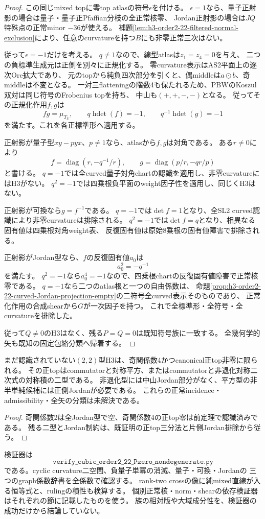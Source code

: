\begin{proof}
この同じmixed topに零top atlasの符号$\epsilon$を付ける。
$\epsilon=1$なら、量子正射影の場合は量子・量子正Pfaffian分枝の全正常核零、
Jordan正射影の場合は$JQ$特殊点の正常minor $-36$が使える。
補題\ref{lem:h3-order2-22-filtered-normal-exclusion}により、任意のcurvatureを持つ$B$にも非零正常三次はない。

従って$\epsilon=-1$だけを考える。
$q\ne1$なので、線型atlasは$z_1=z_4=0$を与え、
二つの負標準生成元は正側を別々に正規化する。
零curvature表示はAS2平面上の逐次Ore拡大であり、
元のtopから純負四次部分を引くと、偶middleは$a\mathbin{\odot}b$、奇middleは不変となる。
一対三flatteningの階数4も保たれるため、PBWのKoszul双対は同じ符号のFrobenius topを持ち、
中山も$(+,+,-,-)$となる。
従ってその正規化作用$f,g$は
\[
 fg=\mu_{T_U},\qquad
 q\operatorname{hdet}(f)=-1,\qquad
 q^{-1}\operatorname{hdet}(g)=-1
\]
を満たす。これを各正標準形へ適用する。

正射影が量子型$xy-pyx$、$p\ne1$なら、atlasから$f,g$は対角である。
ある$r\ne0$により
\[
 f=\operatorname{diag}(r,-q^{-1}/r),\qquad
 g=\operatorname{diag}(p/r,-qr/p)
\]
と書ける。
$q=-1$では全curved量子対角chartの認識を適用し、非零curvatureにはH3がない。
$q^2=-1$では四乗根負平面のweight因子性を適用し、同じくH3はない。

正射影が可換なら$g=f^{-1}$である。
$q=-1$では$\det f=1$となり、全SL2 curved認識により非零curvatureは排除される。
$q^2=-1$では$\det f=q$となり、相異なる固有値は四乗根対角weight表、
反復固有値は原始8乗根の固有値障害で排除される。

正射影がJordan型なら、$f$の反復固有値$a_0$は
\[
 a_0^2=-q^{-1}
\]
を満たす。
$q^2=-1$なら$a_0^4=-1$なので、四乗根chartの反復固有値障害で正常核零である。
$q=-1$なら二つのatlas根と一つの自由係数は、
命題\ref{prop:h3-order2-22-curved-Jordan-projection-empty}の二符号全curved表示そのものであり、
正常化作用の合成shearから$G$が一次因子を持つ。
これで全標準形・全符号・全curvatureを排除した。

従って$Q\ne0$のH3はなく、残る$P=Q=0$は既知符号族に一致する。
全幾何学的矢も既知の固定包絡分類へ帰着する。
\end{proof}

\begin{corollary}
\label{cor:h3-order2-22-nonzero-positive-remainder}
まだ認識されていない$(2,2)$型H3は、奇関係数4かつcanonical正top非零に限られる。
その正topはcommutatorと対称平方、またはcommutatorと非退化対称二次式の対称積の二型である。
非退化型には中山Jordan部分がなく、平方型の非半単純候補には正側Jordanが必要である。
これらの正常incidence・admissibility・全矢の分類は未解決である。
\end{corollary}
\begin{proof}
奇関係数2は全Jordan型で空、奇関係数4の正top零は前定理で認識済みである。
残る二型とJordan制約は、既証明の正top三分法と片側Jordan排除から従う。
\end{proof}

検証器は
\[
 \texttt{verify\_cubic\_order2\_22\_Pzero\_nondegenerate.py}
\]
である。cyclic curvature二空間、負量子単冪の消滅、量子・可換・Jordanの
三つのgraph係数辞書を全係数で確認する。
rank-two crossの像に純mixed直線が入る恒等式と、rulingの積性も検算する。
個別正常核・norm・shearの依存検証器はそれぞれの節に記載したものを使う。
族の相対版や大域成分性を、検証器の成功だけから結論していない。
